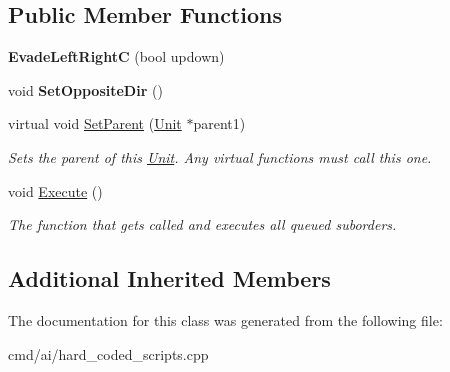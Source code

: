 \subsection*{Public Member Functions}
\begin{DoxyCompactItemize}
\item 
{\bfseries Evade\+Left\+RightC} (bool updown)\hypertarget{classEvadeLeftRightC_ad8e291bb185c997c09c746d66bf5515f}{}\label{classEvadeLeftRightC_ad8e291bb185c997c09c746d66bf5515f}

\item 
void {\bfseries Set\+Opposite\+Dir} ()\hypertarget{classEvadeLeftRightC_a7fa41deeef3bc837699c3a0c325dd5af}{}\label{classEvadeLeftRightC_a7fa41deeef3bc837699c3a0c325dd5af}

\item 
virtual void \hyperlink{classEvadeLeftRightC_a450ec55b6da811c3288c0d673b1b39f8}{Set\+Parent} (\hyperlink{classUnit}{Unit} $\ast$parent1)\hypertarget{classEvadeLeftRightC_a450ec55b6da811c3288c0d673b1b39f8}{}\label{classEvadeLeftRightC_a450ec55b6da811c3288c0d673b1b39f8}

\begin{DoxyCompactList}\small\item\em Sets the parent of this \hyperlink{classUnit}{Unit}. Any virtual functions must call this one. \end{DoxyCompactList}\item 
void \hyperlink{classEvadeLeftRightC_aa67a3d4320b5ea76f5393333e24fe62f}{Execute} ()\hypertarget{classEvadeLeftRightC_aa67a3d4320b5ea76f5393333e24fe62f}{}\label{classEvadeLeftRightC_aa67a3d4320b5ea76f5393333e24fe62f}

\begin{DoxyCompactList}\small\item\em The function that gets called and executes all queued suborders. \end{DoxyCompactList}\end{DoxyCompactItemize}
\subsection*{Additional Inherited Members}


The documentation for this class was generated from the following file\+:\begin{DoxyCompactItemize}
\item 
cmd/ai/hard\+\_\+coded\+\_\+scripts.\+cpp\end{DoxyCompactItemize}
